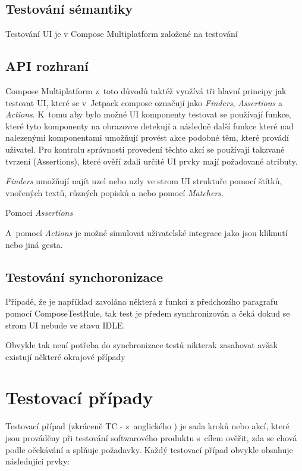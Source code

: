 \subsection{Testování sémantiky}
Testování UI je v Compose Multiplatform založené na testování 


\subsection{API rozhraní}
Compose Multiplatform z~toto důvodů taktéž využívá tři hlavní principy jak testovat UI, které se v~Jetpack compose
označují jako \textit{Finders}, \textit{Assertions} a \textit{Actions}. 
K~tomu aby bylo možné UI komponenty testovat se používají funkce, které tyto komponenty na obrazovce detekují a následně další funkce které nad nalezenými 
komponentami umožňují provést akce podobné těm, které provádí uživatel. Pro kontrolu správnosti provedení těchto akcí se používají takzvané tvrzení 
(Assertions), které ověří zdali určité UI prvky mají požadované atributy.

\textit{Finders} umožňují najít uzel nebo uzly ve strom UI struktuře pomocí štítků, vnořených textů, různých popisků a nebo pomocí \textit{Matchers}.


Pomocí \textit{Assertions}

A~pomocí \textit{Actions} je možné simulovat uživatelské integrace jako jsou kliknutí nebo jiná gesta. \cite{composeTesting}

\subsection{Testování synchoronizace}
Případě, že je například zavolána některá z funkcí z předchozího paragrafu pomocí ComposeTestRule, tak test je předem synchronizován a čeká dokud 
se strom UI nebude ve stavu IDLE. 

Obvykle tak není potřeba do synchronizace testů nikterak zasahovat avšak existují některé okrajové případy


\section{Testovací případy}\label{testCases}
Testovací případ (zkráceně TC - z~anglického ) je sada kroků nebo akcí, které jsou prováděny při testování softwarového produktu 
s~cílem ověřit, zda se chová podle očekávání a splňuje požadavky. Každý testovací případ obvykle obsahuje následující prvky:

